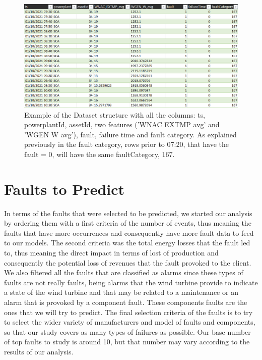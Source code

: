 \begin{figure}[htbp]
	\centering
	\includegraphics[scale=0.67]{Chapters/Figures/methodology_fig12.png}
	\caption{Example of the Dataset structure with all the columns: ts, powerplantId, assetId, two features ('WNAC EXTMP avg' and 'WGEN W avg'), fault, failure time and fault category. As explained previously in the fault category, rows prior to 07:20, that have the fault = 0, will have the same faultCategory, 167.}
	\label{fig:Figuras_Tree_silhouettes-vectorial}
\end{figure}

\section{Faults to Predict} 
\label{sub:if_you_use_this_template} 

In terms of the faults that were selected to be predicted, we started our analysis by ordering them with a first criteria of the number of events, thus meaning the faults that have more occurrences and consequently have more fault data to feed to our models. The second criteria was the total energy losses that the fault led to, thus meaning the direct impact in terms of lost of production and consequently the potential loss of revenues that the fault provoked to the client. We also filtered all the faults that are classified as alarms since these types of faults are not really faults, being alarms that the wind turbine provide to indicate a state of the wind turbine and that may be related to a maintenance or an alarm that is provoked by a component fault. These components faults are the ones that we will try to predict. The final selection criteria of the faults is to try to select the wider variety of manufacturers and model of faults and components, so that our study covers as many types of failures as possible. Our base number of top faults to study is around 10, but that number may vary according to the results of our analysis.

